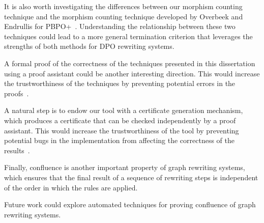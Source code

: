 \documentclass{report}
\begin{document}
It is also worth investigating the differences between our morphism counting technique and
 the morphism counting technique developed by Overbeek and Endrullis for PBPO+~\cite{overbeek2024termination_lmcs}. Understanding the relationship between these two techniques could lead to a more general termination criterion that leverages the strengths of both methods for DPO rewriting systems. 
 
A formal proof of the correctness of the techniques presented in this dissertation using a proof assistant could be another interesting direction. This would increase the trustworthiness of the techniques by preventing potential errors in the proofs~\cite{contejean2004certified}.

A natural step is to endow our tool with a certificate generation mechanism, which produces a certificate that can be checked independently by a proof assistant. This would increase the trustworthiness of the tool by preventing potential bugs in the implementation from affecting the correctness of the results~\cite{contejean2007certification,contejean2010a3pat}.
   
Finally, confluence is another important property of graph rewriting systems, which ensures that the final result of a sequence of rewriting steps is independent of the order in which the rules are applied. 

Future work could explore automated techniques for proving confluence of graph rewriting systems.

\printbibliography
\end{document}
